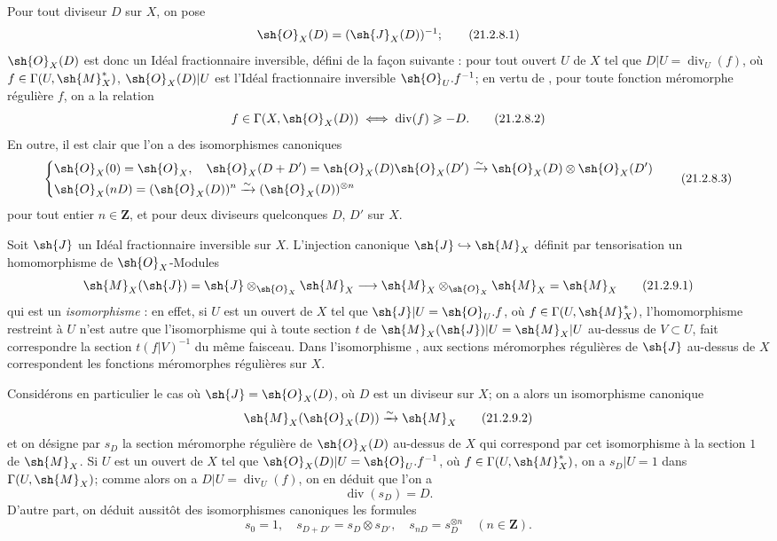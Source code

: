 \begin{env}[21.2.8]
\label{IV.21.2.8}
Pour tout diviseur $D$ sur $X$, on pose
\[
\label{IV.21.2.8.1}
  \sh{O}_X(D)=(\sh{J}_X(D))^{-1};
  \tag{21.2.8.1}
\]
$\sh{O}_X(D)$ est donc un Idéal fractionnaire inversible, défini de la façon suivante : pour tout ouvert $U$ de $X$ tel que $D|U=\operatorname{div}_U(f)$, où $f\in\Gamma(U,\sh{M}_X^*)$, $\sh{O}_X(D)|U$ est l'Idéal
fractionnaire inversible $\sh{O}_U.f^{-1}$;
en vertu de , pour toute fonction méromorphe régulière $f$, on a la relation
\[
\label{IV.21.2.8.2}
  f\in\Gamma(X,\sh{O}_X(D)) \iff \operatorname{div}(f)\geq-D.
  \tag{21.2.8.2}
\]
En outre, il est clair que l'on a des isomorphismes canoniques 
\[
\label{IV.21.2.8.3}
  \left\{\begin{aligned}
    &\sh{O}_X(0)=\sh{O}_X,\quad \sh{O}_X(D+D')=\sh{O}_X(D)\sh{O}_X(D')\xrightarrow{\sim}\sh{O}_X(D)\otimes\sh{O}_X(D')\\
    &\sh{O}_X(nD)=(\sh{O}_X(D))^n\xrightarrow{\sim}(\sh{O}_X(D))^{\otimes n}
  \end{aligned}\right.
  \tag{21.2.8.3}
\]
pour tout entier $n\in\mathbf{Z}$, et pour deux diviseurs quelconques $D$, $D'$ sur $X$.
\end{env}

\begin{env}[21.2.9]
\label{IV.21.2.9}
Soit $\sh{J}$ un Idéal fractionnaire inversible sur $X$.
L'injection canonique $\sh{J}\hookrightarrow\sh{M}_X$ définit par tensorisation un homomorphisme de $\sh{O}_X$-Modules
\[
\label{IV.21.2.9.1}
  \sh{M}_X(\sh{J})=\sh{J}\otimes_{\sh{O}_X}\sh{M}_X\to\sh{M}_X\otimes_{\sh{O}_X}\sh{M}_X=\sh{M}_X
  \tag{21.2.9.1}
\]
qui est un \emph{isomorphisme} : en effet, si $U$ est un ouvert de $X$ tel que $\sh{J}|U=\sh{O}_U.f$, où $f\in\Gamma(U,\sh{M}_X^*)$, l'homomorphisme  restreint à $U$ n'est autre que l'isomorphisme qui à toute section $t$ de $\sh{M}_X(\sh{J})|U=\sh{M}_X|U$ au-dessus de $V\subset U$, fait correspondre la section $t(f|V)^{-1}$ du même faisceau.
Dans l'isomorphisme , aux sections méromorphes régulières de $\sh{J}$ au-dessus de $X$ correspondent les fonctions méromorphes régulières sur $X$.

Considérons en particulier le cas où $\sh{J}=\sh{O}_X(D)$, où $D$ est un diviseur sur $X$;
on a alors un isomorphisme canonique
\[
\label{IV.21.2.9.2}
  \sh{M}_X(\sh{O}_X(D))\xrightarrow{\sim}\sh{M}_X
  \tag{21.2.9.2}
\]
et on désigne par $s_D$ la section méromorphe régulière de $\sh{O}_X(D)$ au-dessus de $X$ qui correspond par cet isomorphisme à la section $1$ de $\sh{M}_X$.
Si $U$ est un ouvert de $X$ tel que $\sh{O}_X(D)|U=\sh{O}_U.f^{-1}$, où $f\in\Gamma(U,\sh{M}_X^*)$, on a $s_D|U=1$ dans $\Gamma(U,\sh{M}_X)$;
comme alors on a $D|U=\operatorname{div}_U(f)$, on en déduit  que l'on a
\[
\label{IV.21.2.9.3}
  \operatorname{div}(s_D)=D.
  \tag{21.2.9.3}
\]
D'autre part, on déduit aussitôt des isomorphismes canoniques  les formules
\[
\label{IV.21.2.9.4}
  s_0=1,\quad s_{D+D'}=s_D\otimes s_{D'},\quad s_{nD}=s_D^{\otimes n}\quad(n\in\mathbf{Z}).
  \tag{21.2.9.4}
\]
\end{env}

